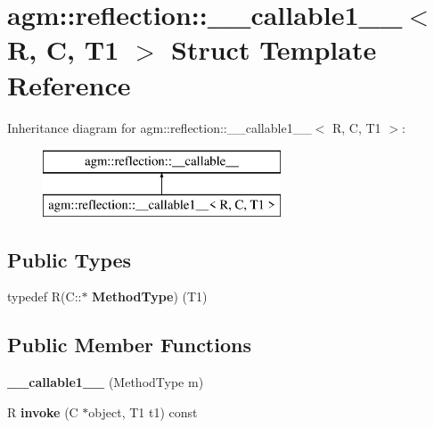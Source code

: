 \hypertarget{structagm_1_1reflection_1_1____callable1____}{}\section{agm\+:\+:reflection\+:\+:\+\_\+\+\_\+callable1\+\_\+\+\_\+$<$ R, C, T1 $>$ Struct Template Reference}
\label{structagm_1_1reflection_1_1____callable1____}
Inheritance diagram for agm\+:\+:reflection\+:\+:\+\_\+\+\_\+callable1\+\_\+\+\_\+$<$ R, C, T1 $>$\+:\begin{figure}[H]
\begin{center}
\leavevmode
\includegraphics[height=2.000000cm]{structagm_1_1reflection_1_1____callable1____}
\end{center}
\end{figure}
\subsection*{Public Types}
\begin{DoxyCompactItemize}
\item 
typedef R(C\+::$\ast$ {\bfseries Method\+Type}) (T1)\hypertarget{structagm_1_1reflection_1_1____callable1_____a5a200e6d8ba78d788e5cfe92aead1130}{}\label{structagm_1_1reflection_1_1____callable1_____a5a200e6d8ba78d788e5cfe92aead1130}

\end{DoxyCompactItemize}
\subsection*{Public Member Functions}
\begin{DoxyCompactItemize}
\item 
{\bfseries \+\_\+\+\_\+callable1\+\_\+\+\_\+} (Method\+Type m)\hypertarget{structagm_1_1reflection_1_1____callable1_____ad4ee4a4ee1a1426316fbf34b8ca911b7}{}\label{structagm_1_1reflection_1_1____callable1_____ad4ee4a4ee1a1426316fbf34b8ca911b7}

\item 
R {\bfseries invoke} (C $\ast$object, T1 t1) const \hypertarget{structagm_1_1reflection_1_1____callable1_____ab2be089562e48d04ea41a799da988a8c}{}\label{structagm_1_1reflection_1_1____callable1_____ab2be089562e48d04ea41a799da988a8c}

\end{DoxyCompactItemize}
